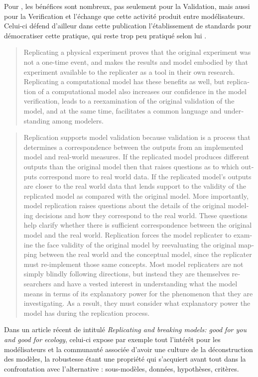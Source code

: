 Pour \textcite{Wilensky2007a}, les bénéfices sont nombreux, pas seulement pour la Validation, mais aussi pour la Verification  et l'échange que cette activité produit entre modélisateurs. Celui-ci défend d'ailleur dans cette publication l'établissement de standards pour démocratiser cette pratique, qui reste trop peu pratiqué selon lui .

\foreignblockquote{english}[\cite{Wilensky2007a}]{Replicating a physical experiment proves that the original experiment was not a one-time event, and makes the results and model embodied by that experiment available to the replicater as a tool in their own research. Replicating a computational model has these benefits as well, but replication of a computational model also increases our confidence in the model verification, leads to a reexamination of the original validation of the model, and at the same time, facilitates a common language and understanding among modelers.}

\foreignblockquote{english}[\cite{Wilensky2007a}]{Replication supports model validation because validation is a process that determines a correspondence between the outputs from an implemented model and real-world measures. If the replicated model produces different outputs than the original model then that raises questions as to which outputs correspond more to real world data. If the replicated model's outputs are closer to the real world data that lends support to the validity of the replicated model as compared with the original model. More importantly, model replication raises questions about the details of the original modeling decisions and how they correspond to the real world. These questions help clarify whether there is sufficient correspondence between the original model and the real world. Replication forces the model replicater to examine the face validity of the original model by reevaluating the original mapping between the real world and the conceptual model, since the replicater must re-implement those same concepts. Most model replicaters are not simply blindly following directions, but instead they are themselves researchers and have a vested interest in understanding what the model means in terms of its explanatory power for the phenomenon that they are investigating. As a result, they must consider what explanatory power the model has during the replication process.}

Dans un article récent de \textcite{Thiele2015} intitulé \textit{Replicating and breaking models: good for you and good for ecology}, celui-ci expose par exemple tout l'intérêt pour les modélisateurs et la communauté associée d'avoir une culture de la déconstruction des modèles, la robustesse étant une propriété qui s'acquiert avant tout dans la confrontation avec l'alternative : sous-modèles, données, hypothèses, critères.

